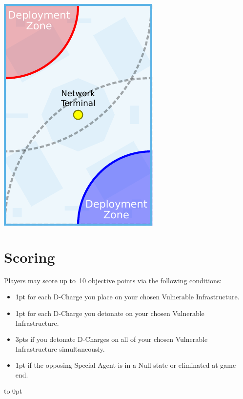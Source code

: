 \begin{minipage}[t]{2in}\centering
\vspace{4pt}   
\includegraphics{maps/map-plant}
\end{minipage}

\section{Scoring}

Players may score up to~10 objective points via the following
conditions:
\begin{itemize}\shortlist
\item 1pt for each D-Charge you place on your chosen Vulnerable
  Infrastructure.
\item 1pt for each D-Charge you detonate on your chosen Vulnerable
  Infrastructure.
\item 3pts if you detonate D-Charges on all of your chosen Vulnerable
  Infrastructure simultaneously.

\item 1pt if the opposing Special Agent is in a Null state or
  eliminated at game end.
\end{itemize}

\vfill
\vbox to 0pt{}